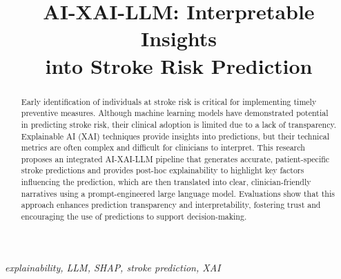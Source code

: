 \documentclass[conference]{IEEEtran}
\begin{document}
\title{AI-XAI-LLM: Interpretable Insights \\into Stroke Risk Prediction}

\author{
\and
{}
}

\IEEEoverridecommandlockouts
{}
\maketitle

\begin{abstract}
Early identification of individuals at stroke risk is critical for implementing timely preventive measures. Although machine learning models have demonstrated potential in predicting stroke risk, their clinical adoption is limited due to a lack of transparency. Explainable AI (XAI) techniques provide insights into predictions, but their technical metrics are often complex and difficult for clinicians to interpret. This research proposes an integrated AI-XAI-LLM pipeline that generates accurate, patient-specific stroke predictions and provides post-hoc explainability to highlight key factors influencing the prediction, which are then translated into clear, clinician-friendly narratives using a prompt-engineered large language model. Evaluations show that this approach enhances prediction transparency and interpretability, fostering trust and encouraging the use of predictions to support decision-making.
\end{abstract}

\medskip

\begin{IEEEkeywords}
\textit{explainability, LLM, SHAP, stroke prediction, XAI}
\end{IEEEkeywords}

 

\begingroup

\def\IEEEbibitemsep{0pt plus .5pt}

\endgroup
	
\end{document}
